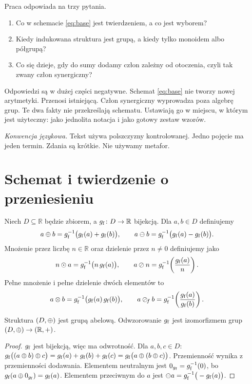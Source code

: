 \documentclass[11pt,a4paper]{article}
\begin{document}
Praca odpowiada na trzy pytania.
\begin{enumerate}[label=(\roman*),leftmargin=2.2em]
  \item Co w schemacie \eqref{eq:base} jest twierdzeniem, a co jest wyborem?
  \item Kiedy indukowana struktura jest grupą, a kiedy tylko monoidem albo
        półgrupą?
  \item Co się dzieje, gdy do sumy dodamy człon zależny od otoczenia, czyli
        tak zwany człon synergiczny?
\end{enumerate}

Odpowiedzi są w dużej części negatywne. Schemat \eqref{eq:base} nie tworzy
nowej arytmetyki. Przenosi istniejącą. Człon synergiczny wyprowadza poza
algebrę grup. Te dwa fakty nie przekreślają schematu. Ustawiają go w miejscu,
w którym jest użyteczny: jako jednolita notacja i jako gotowy zestaw wzorów.

\smallskip
\noindent
\textit{Konwencja językowa.} Tekst używa polszczyzny kontrolowanej. Jedno
pojęcie ma jeden termin. Zdania są krótkie. Nie używamy metafor.

\section{Schemat i twierdzenie o przeniesieniu}

\begin{definition}
\label{def:arith}
Niech $D\subseteq\mathbb{R}$ będzie zbiorem, a $g_{\mathrm{f}}\colon D\to\mathbb{R}$
bijekcją. Dla $a,b\in D$ definiujemy
\[
a\mathbin{\oplus} b=g_{\mathrm{f}}^{-1}\big(g_{\mathrm{f}}(a)+g_{\mathrm{f}}(b)\big),\qquad
a\mathbin{\ominus} b=g_{\mathrm{f}}^{-1}\big(g_{\mathrm{f}}(a)-g_{\mathrm{f}}(b)\big).
\]
Mnożenie przez liczbę $n\in\mathbb{R}$ oraz dzielenie przez $n\neq0$
definiujemy jako
\[
n\mathbin{\odot} a=g_{\mathrm{f}}^{-1}\big(n\,g_{\mathrm{f}}(a)\big),\qquad
a\mathbin{\oslash} n=g_{\mathrm{f}}^{-1}\!\left(\frac{g_{\mathrm{f}}(a)}{n}\right).
\]
Pełne mnożenie i pełne dzielenie dwóch elementów to
\[
a\mathbin{\otimes} b=g_{\mathrm{f}}^{-1}\big(g_{\mathrm{f}}(a)\,g_{\mathrm{f}}(b)\big),\qquad
a\mathbin{\oslash}_{\!f} b=g_{\mathrm{f}}^{-1}\!\left(\frac{g_{\mathrm{f}}(a)}{g_{\mathrm{f}}(b)}\right).
\]
\end{definition}

\begin{theorem}
\label{thm:transport}
Struktura $(D,\mathbin{\oplus})$ jest grupą abelową. Odwzorowanie $g_{\mathrm{f}}$ jest izomorfizmem
grup $(D,\mathbin{\oplus})\to(\mathbb{R},+)$.
\end{theorem}

\begin{proof}
$g_{\mathrm{f}}$ jest bijekcją, więc ma odwrotność. Dla $a,b,c\in D$:
$g_{\mathrm{f}}\big((a\mathbin{\oplus} b)\mathbin{\oplus} c\big)=g_{\mathrm{f}}(a)+g_{\mathrm{f}}(b)+g_{\mathrm{f}}(c)
=g_{\mathrm{f}}\big(a\mathbin{\oplus}(b\mathbin{\oplus} c)\big)$. Przemienność wynika z przemienności dodawania.
Elementem neutralnym jest $0_{g_{\mathrm{f}}}=g_{\mathrm{f}}^{-1}(0)$, bo
$g_{\mathrm{f}}(a\mathbin{\oplus} 0_{g_{\mathrm{f}}})=g_{\mathrm{f}}(a)$. Elementem przeciwnym do $a$ jest
$\mathbin{\ominus} a=g_{\mathrm{f}}^{-1}\big(-g_{\mathrm{f}}(a)\big)$.
\end{proof}
\end{document}
